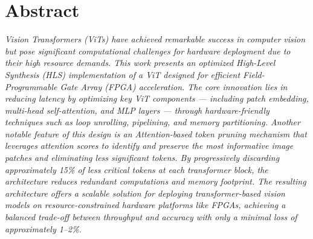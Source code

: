 \newpage
\chapter*{\centering Abstract}
\textit{
Vision Transformers (ViTs) have achieved remarkable success in computer vision but pose significant computational challenges for hardware deployment due to their high resource demands. This work presents an optimized High-Level Synthesis (HLS) implementation of a ViT designed for efficient Field-Programmable Gate Array (FPGA) acceleration. The core innovation lies in reducing latency by optimizing key ViT components — including patch embedding, multi-head self-attention, and MLP layers — through hardware-friendly techniques such as loop unrolling, pipelining, and memory partitioning. Another notable feature of this design is an Attention-based token pruning mechanism that leverages attention scores to identify and preserve the most informative image patches and eliminating less significant tokens. By progressively discarding approximately 15\% of less critical tokens at each transformer block, the architecture reduces redundant computations and memory footprint.  The resulting architecture offers a scalable solution for deploying transformer-based vision models on resource-constrained hardware platforms like FPGAs, achieving a balanced trade-off between throughput and accuracy with only a minimal loss of approximately 1–2\%.}

